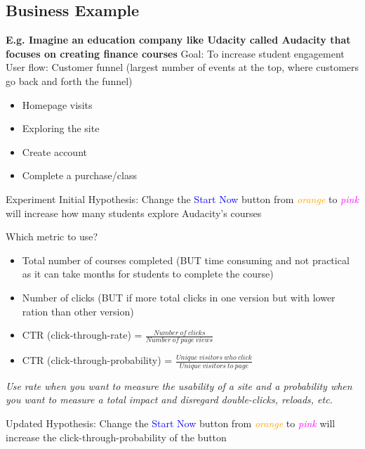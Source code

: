 \documentclass[10pt]{article}
\theoremstyle{definition}
\begin{document}
\subsection{Business Example}
\textbf{E.g. Imagine an education company like Udacity called Audacity that focuses on creating finance courses}
Goal: To increase student engagement
User flow: Customer funnel (largest number of  events at the top, where customers go back and forth the funnel)
\begin{itemize}
    \item Homepage visits
    \item Exploring the site
    \item Create account
    \item Complete a purchase/class
\end{itemize}
Experiment 
Initial Hypothesis: Change the \textcolor{blue}{Start Now} button from \textcolor{orange}{\textit{orange}} to \textcolor{magenta}{\textit{pink}} will increase how many students explore Audacity's courses

Which metric to use?
\begin{itemize}
    \item Total number of courses completed (BUT time consuming and not practical as it can take months for students to complete the course)
    \item  Number of clicks (BUT if more total clicks in one version but with lower ration than other version) 
    \item CTR (click-through-rate) = $\frac{Number\:of \:clicks}{Number\:of\:page\:views}$
    \item CTR (click-through-probability) = $\frac{Unique\: visitors\:who\:click}{Unique\:visitors\:to\:page}$
\end{itemize}

\begin{tcolorbox}[colback=cyan!10, boxrule=0mm, sharp corners]
\textit{Use rate when you want to measure the usability of a site and a probability when you want to measure a total impact and disregard double-clicks, reloads, etc.}
\end{tcolorbox}

Updated Hypothesis: Change the \textcolor{blue}{Start Now} button from \textcolor{orange}{\textit{orange}} to \textcolor{magenta}{\textit{pink}} will increase the click-through-probability of the button
\end{document}
